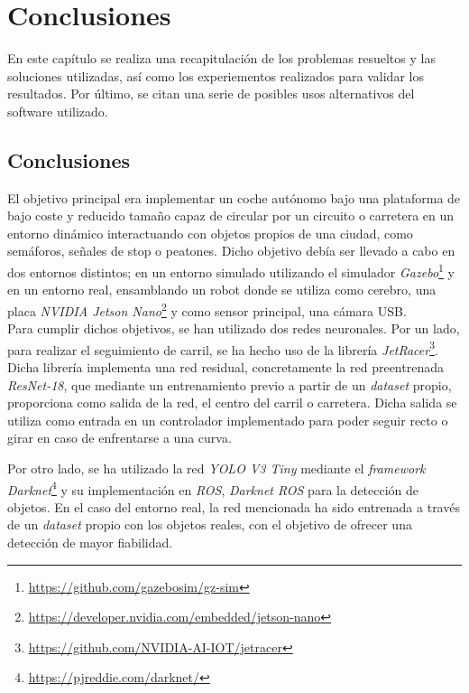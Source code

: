 \chapter{Conclusiones}
\label{cap:capitulo5}
En este capítulo se realiza una recapitulación de los problemas resueltos y las soluciones utilizadas, así como los experiementos realizados para validar los resultados. Por último, se citan una serie de posibles usos alternativos del software utilizado.\\

\section{Conclusiones}
\label{section:conclusiones}
El objetivo principal era implementar un coche autónomo bajo una plataforma de bajo coste y reducido tamaño capaz de circular por un circuito o carretera en un entorno dinámico interactuando con objetos propios de una ciudad, como semáforos, señales de stop o peatones. Dicho objetivo debía ser llevado a cabo en dos entornos distintos; en un entorno simulado utilizando el simulador \textit{Gazebo}\footnote{\url{https://github.com/gazebosim/gz-sim}} y en un entorno real, ensamblando un robot donde se utiliza como cerebro, una placa \textit{NVIDIA Jetson Nano}\footnote{\url{https://developer.nvidia.com/embedded/jetson-nano}} y como sensor principal, una cámara USB.\\

Para cumplir dichos objetivos, se han utilizado dos redes neuronales. Por un lado, para realizar el seguimiento de carril, se ha hecho uso de la librería \textit{JetRacer}\footnote{\url{https://github.com/NVIDIA-AI-IOT/jetracer}}. Dicha librería implementa una red residual, concretamente la red preentrenada \textit{ResNet-18}, que mediante un entrenamiento previo a partir de un \textit{dataset} propio, proporciona como salida de la red, el centro del carril o carretera. Dicha salida se utiliza como entrada en un controlador implementado para poder seguir recto o girar en caso de enfrentarse a una curva.

Por otro lado, se ha utilizado la red \textit{YOLO V3 Tiny} mediante el \textit{framework} \textit{Darknet}\footnote{\url{https://pjreddie.com/darknet/}} y su implementación en \textit{ROS}, \textit{Darknet ROS} para la detección de objetos. En el caso del entorno real, la red mencionada ha sido entrenada a través de un \textit{dataset} propio con los objetos reales, con el objetivo de ofrecer una detección de mayor fiabilidad. 


